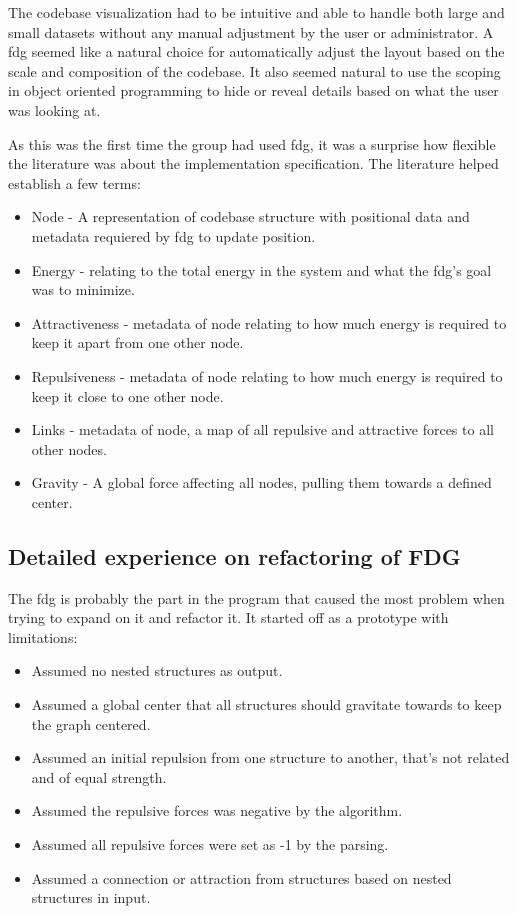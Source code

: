 The codebase visualization had to be intuitive and able to handle both large and small datasets without any manual adjustment by the user or administrator. A \gls{fdg} seemed like a natural choice for automatically adjust the layout based on the scale and composition of the codebase. It also seemed natural to use the scoping in object oriented programming to hide or reveal details based on what the user was looking at.

As this was the first time the group had used \gls{fdg}, it was a surprise how flexible the literature was about the implementation specification. The literature helped establish a few terms:

\begin{itemize}
    \item Node - A representation of codebase structure with positional data and metadata requiered by \gls{fdg} to update position.
    \item Energy - relating to the total energy in the system and what the \gls{fdg}'s goal was to minimize.
    \item Attractiveness - metadata of node relating to how much energy is required to keep it apart from one other node.
    \item Repulsiveness - metadata of node relating to how much energy is required to keep it close to one other node.
    \item Links - metadata of node, a map of all repulsive and attractive forces to all other nodes.
    \item Gravity - A global force affecting all nodes, pulling them towards a defined center.
\end{itemize}

\subsection{Detailed experience on refactoring of FDG}
The \gls{fdg} is probably the part in the program that caused the most problem when trying to expand on it and refactor it.
It started off as a prototype with limitations:
\begin{itemize}
    \item Assumed no nested structures as output.
    \item Assumed a global center that all structures should gravitate towards to keep the graph centered.
    \item Assumed an initial repulsion from one structure to another, that's not related and of equal strength.
    \item Assumed the repulsive forces was negative by the algorithm.
    \item Assumed all repulsive forces were set as -1 by the parsing.
    \item Assumed a connection or attraction from structures based on nested structures in input.
\end{itemize}

